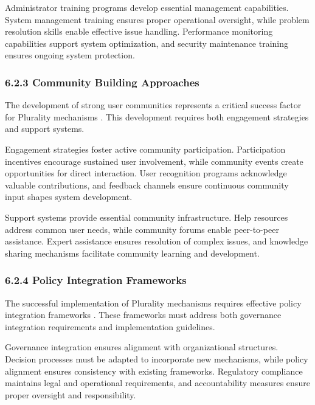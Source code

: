Administrator training programs develop essential management capabilities. System management training ensures proper operational oversight, while problem resolution skills enable effective issue handling. Performance monitoring capabilities support system optimization, and security maintenance training ensures ongoing system protection.

\hypertarget{community-building-approaches}{%
\subsubsection{6.2.3 Community Building Approaches}\label{community-building-approaches}}

The development of strong user communities represents a critical success factor for Plurality mechanisms \citep{vtaiwan2023}. This development requires both engagement strategies and support systems.

Engagement strategies foster active community participation. Participation incentives encourage sustained user involvement, while community events create opportunities for direct interaction. User recognition programs acknowledge valuable contributions, and feedback channels ensure continuous community input shapes system development.

Support systems provide essential community infrastructure. Help resources address common user needs, while community forums enable peer-to-peer assistance. Expert assistance ensures resolution of complex issues, and knowledge sharing mechanisms facilitate community learning and development.

\hypertarget{policy-integration-frameworks}{%
\subsubsection{6.2.4 Policy Integration Frameworks}\label{policy-integration-frameworks}}

The successful implementation of Plurality mechanisms requires effective policy integration frameworks \citep{pdis2024}. These frameworks must address both governance integration requirements and implementation guidelines.

Governance integration ensures alignment with organizational structures. Decision processes must be adapted to incorporate new mechanisms, while policy alignment ensures consistency with existing frameworks. Regulatory compliance maintains legal and operational requirements, and accountability measures ensure proper oversight and responsibility.

